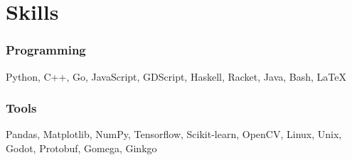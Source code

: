 \section{Skills}

\begin{resumeItem}

\subsubsection{Programming}
Python, C++, Go, JavaScript, GDScript, Haskell, Racket, Java, Bash, {\LaTeX}

\subsubsection{Tools}
Pandas, Matplotlib, NumPy, Tensorflow, Scikit-learn, OpenCV, Linux, Unix, Godot, Protobuf, Gomega, Ginkgo
\end{resumeItem}

